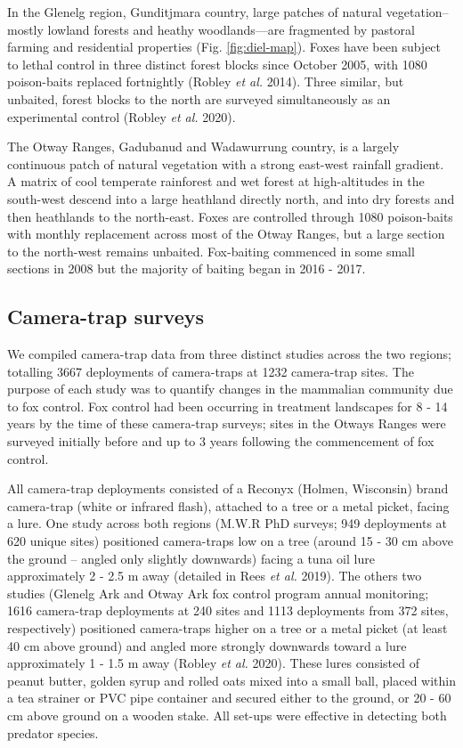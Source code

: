 \documentclass[11pt,a4paper,titlepage,twoside,openright]{style/unimelbthesis}
\begin{document}
\begin{mainmatter}
In the Glenelg region, Gunditjmara country, large patches of natural vegetation--mostly lowland forests and heathy woodlands---are fragmented by pastoral farming and residential properties (Fig. \ref{fig:diel-map}). Foxes have been subject to lethal control in three distinct forest blocks since October 2005, with 1080 poison-baits replaced fortnightly (Robley \emph{et al.} 2014). Three similar, but unbaited, forest blocks to the north are surveyed simultaneously as an experimental control (Robley \emph{et al.} 2020).

The Otway Ranges, Gadubanud and Wadawurrung country, is a largely continuous patch of natural vegetation with a strong east-west rainfall gradient. A matrix of cool temperate rainforest and wet forest at high-altitudes in the south-west descend into a large heathland directly north, and into dry forests and then heathlands to the north-east. Foxes are controlled through 1080 poison-baits with monthly replacement across most of the Otway Ranges, but a large section to the north-west remains unbaited. Fox-baiting commenced in some small sections in 2008 but the majority of baiting began in 2016 - 2017.

\hypertarget{camera-trap-surveys}{%
\subsection{Camera-trap surveys}\label{camera-trap-surveys}}

We compiled camera-trap data from three distinct studies across the two regions; totalling 3667 deployments of camera-traps at 1232 camera-trap sites. The purpose of each study was to quantify changes in the mammalian community due to fox control. Fox control had been occurring in treatment landscapes for 8 - 14 years by the time of these camera-trap surveys; sites in the Otways Ranges were surveyed initially before and up to 3 years following the commencement of fox control.

All camera-trap deployments consisted of a Reconyx (Holmen, Wisconsin) brand camera-trap (white or infrared flash), attached to a tree or a metal picket, facing a lure. One study across both regions (M.W.R PhD surveys; 949 deployments at 620 unique sites) positioned camera-traps low on a tree (around 15 - 30 cm above the ground -- angled only slightly downwards) facing a tuna oil lure approximately 2 - 2.5 m away (detailed in Rees \emph{et al.} 2019). The others two studies (Glenelg Ark and Otway Ark fox control program annual monitoring; 1616 camera-trap deployments at 240 sites and 1113 deployments from 372 sites, respectively) positioned camera-traps higher on a tree or a metal picket (at least 40 cm above ground) and angled more strongly downwards toward a lure approximately 1 - 1.5 m away (Robley \emph{et al.} 2020). These lures consisted of peanut butter, golden syrup and rolled oats mixed into a small ball, placed within a tea strainer or PVC pipe container and secured either to the ground, or 20 - 60 cm above ground on a wooden stake. All set-ups were effective in detecting both predator species.


\end{mainmatter}
\end{document}
